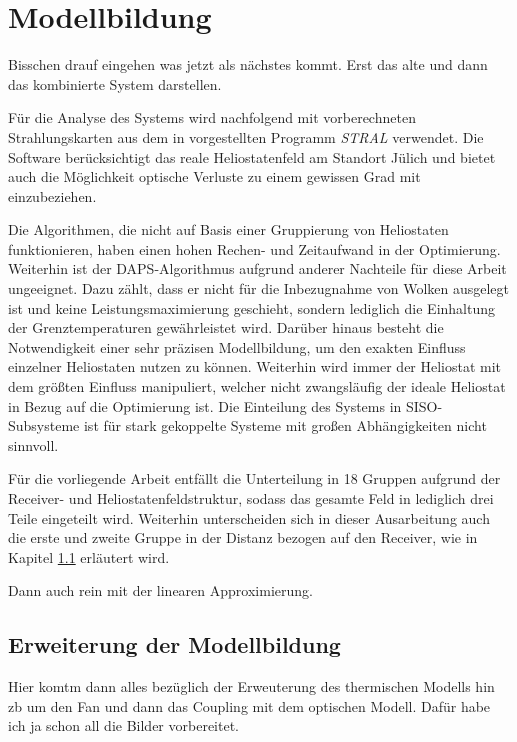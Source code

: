 \chapter{Modellbildung} \label{ch_Modellbildung}
Bisschen drauf eingehen was jetzt als nächstes kommt.
Erst das alte und dann das kombinierte System darstellen.

Für die Analyse des Systems wird nachfolgend mit vorberechneten Strahlungskarten aus dem in \cite[S.53ff]{DissBelhomme} vorgestellten Programm \textit{STRAL} verwendet.
Die Software berücksichtigt das reale Heliostatenfeld am Standort Jülich und bietet auch die Möglichkeit optische Verluste zu einem gewissen Grad mit einzubeziehen.

Die Algorithmen, die nicht auf Basis einer Gruppierung von Heliostaten funktionieren, haben einen hohen Rechen- und Zeitaufwand in der Optimierung.
Weiterhin ist der DAPS-Algorithmus aufgrund anderer Nachteile für diese Arbeit ungeeignet.
Dazu zählt, dass er nicht für die Inbezugnahme von Wolken ausgelegt ist und keine Leistungsmaximierung geschieht, sondern lediglich die Einhaltung der Grenztemperaturen gewährleistet wird.
Darüber hinaus besteht die Notwendigkeit einer sehr präzisen Modellbildung, um den exakten Einfluss einzelner Heliostaten nutzen zu können.
Weiterhin wird immer der Heliostat mit dem größten Einfluss manipuliert, welcher nicht zwangsläufig der ideale Heliostat in Bezug auf die Optimierung ist. \cite[S.35]{DissOberkirsch}
Die Einteilung des Systems in SISO-Subsysteme ist für stark gekoppelte Systeme mit großen Abhängigkeiten nicht sinnvoll. \cite[S.33]{DissZanger}

Für die vorliegende Arbeit entfällt die Unterteilung in 18 Gruppen aufgrund der Receiver- und Heliostatenfeldstruktur, sodass das gesamte Feld in lediglich drei Teile eingeteilt wird.
Weiterhin unterscheiden sich in dieser Ausarbeitung auch die erste und zweite Gruppe in der Distanz bezogen auf den Receiver, wie in Kapitel \ref{sec_ErweiterungModellbildung} erläutert wird.

Dann auch rein mit der linearen Approximierung.


\section{Erweiterung der Modellbildung} \label{sec_ErweiterungModellbildung}
Hier komtm dann alles bezüglich der Erweuterung des thermischen Modells hin zb um den Fan und dann das Coupling mit dem optischen Modell.
Dafür habe ich ja schon all die Bilder vorbereitet.


